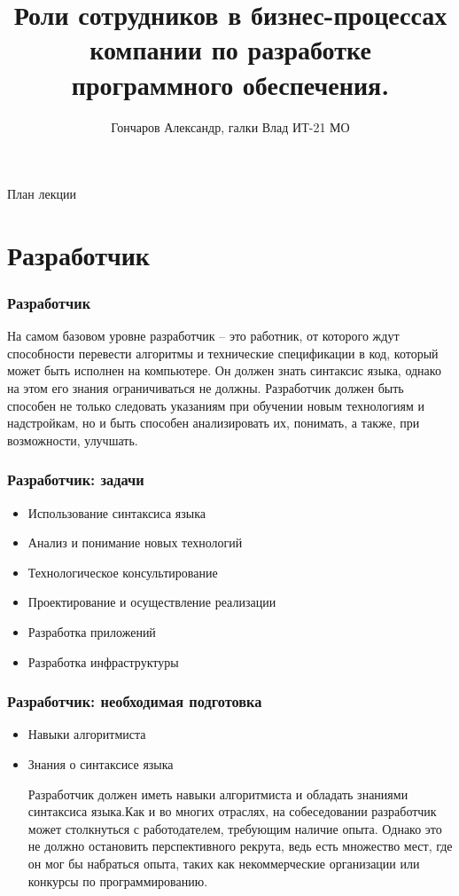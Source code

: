 \documentclass{../industrial-development}
\title{Роли сотрудников в бизнес-процессах компании по разработке программного обеспечения.}
\author{Гончаров Александр, галки Влад ИТ-21 МО}
\date{}
\begin{document}
	
	\begin{frame}
		\titlepage
	\end{frame}
	
	\begin{frame}{План лекции}
		\tableofcontents
	\end{frame}
	
	
	\section{Разработчик }
	
	\begin{frame} \frametitle{Разработчик}
		\begin{block}{}
			\alert {}На самом базовом уровне разработчик – это работник, от которого ждут способности перевести алгоритмы и технические спецификации в код, который может быть исполнен на компьютере. Он должен знать синтаксис языка, однако на этом его знания ограничиваться не должны. Разработчик должен быть способен не только следовать указаниям при обучении новым технологиям и надстройкам, но и быть способен анализировать их, понимать, а также, при возможности, улучшать.
			
		\end{block}
		
	\end{frame}
	
	\begin{frame} \frametitle{Разработчик: задачи}
		\begin{itemize}
			\item Использование синтаксиса языка
			\item Анализ и понимание новых технологий
			\item Технологическое консультирование
			\item Проектирование и осуществление реализации
			\item Разработка приложений
			\item Разработка инфраструктуры
		\end{itemize}
	\end{frame}
	
	\begin{frame} \frametitle{Разработчик: необходимая подготовка}
		\begin{itemize}
			\item Навыки алгоритмиста 
			\item Знания о синтаксисе языка
			\begin{block}{}
				\alert {Разработчик} должен иметь навыки алгоритмиста и обладать знаниями синтаксиса языка.Как и во многих отраслях, на собеседовании разработчик может столкнуться с работодателем, требующим наличие опыта. Однако это не должно остановить перспективного рекрута, ведь есть множество мест, где он мог бы набраться опыта, таких как некоммерческие организации или конкурсы по программированию. 
			\end{block}
		\end{itemize}
		
	\end{frame}
	
\end{document}
